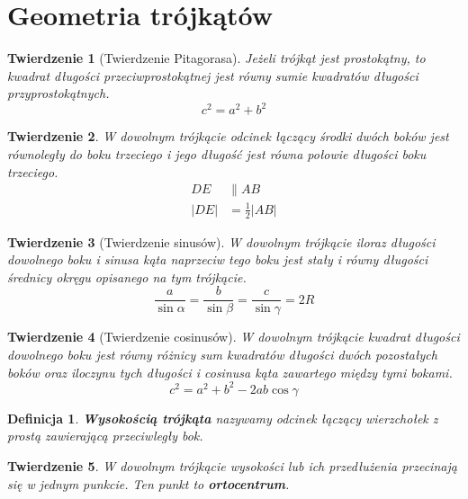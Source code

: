 \documentclass{report}
\newtheorem*{definition}{Definicja}
\newtheorem{theorem}{Twierdzenie}
\begin{document}
    \section{Geometria trójkątów}
      \begin{theorem}[Twierdzenie Pitagorasa]
        Jeżeli trójkąt jest prostokątny, to kwadrat długości przeciwprostokątnej jest równy sumie kwadratów długości przyprostokątnych.
        \begin{equation}
          c^2 = a^2 + b^2
        \end{equation}
      \end{theorem}
      \begin{theorem}
        W dowolnym trójkącie odcinek łączący środki dwóch boków jest równoległy do boku trzeciego i jego długość jest równa połowie długości boku trzeciego.
        \begin{equation}
          \begin{aligned}
            DE &\parallel AB\\
            |DE| &= \frac 12|AB|
          \end{aligned}
        \end{equation}
      \end{theorem}
      \begin{theorem}[Twierdzenie sinusów]
        W dowolnym trójkącie iloraz długości dowolnego boku i sinusa kąta naprzeciw tego boku jest stały i równy długości średnicy okręgu opisanego na tym trójkącie.
        \begin{equation}
          \frac{a}{\sin\alpha} = \frac{b}{\sin\beta} = \frac{c}{\sin\gamma} = 2R
        \end{equation}
      \end{theorem}
      \begin{theorem}[Twierdzenie cosinusów]
        W dowolnym trójkącie kwadrat długości dowolnego boku jest równy różnicy sum kwadratów długości dwóch pozostałych boków oraz iloczynu tych długości i cosinusa kąta zawartego między tymi bokami.
        \begin{equation}
          c^2 = a^2 + b^2 - 2ab\cos\gamma
        \end{equation}
      \end{theorem}
      \begin{definition}
        \textbf{Wysokością trójkąta} nazywamy odcinek łączący wierzchołek z prostą zawierającą przeciwległy bok.
      \end{definition}
      \begin{theorem}
        W dowolnym trójkącie wysokości lub ich przedłużenia przecinają się w jednym punkcie. Ten punkt to \textbf{ortocentrum}.
      \end{theorem}
\end{document}
